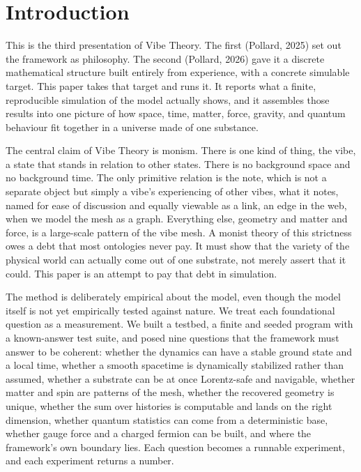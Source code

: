 \section{Introduction}
\label{sec:introduction}

This is the third presentation of Vibe Theory. The first (Pollard, 2025) set out the framework as philosophy. The second (Pollard, 2026) gave it a discrete mathematical structure built entirely from experience, with a concrete simulable target. This paper takes that target and runs it. It reports what a finite, reproducible simulation of the model actually shows, and it assembles those results into one picture of how space, time, matter, force, gravity, and quantum behaviour fit together in a universe made of one substance.

The central claim of Vibe Theory is monism. There is one kind of thing, the vibe, a state that stands in relation to other states. There is no background space and no background time. The only primitive relation is the note, which is not a separate object but simply a vibe's experiencing of other vibes, what it notes, named for ease of discussion and equally viewable as a link, an edge in the web, when we model the mesh as a graph. Everything else, geometry and matter and force, is a large-scale pattern of the vibe mesh. A monist theory of this strictness owes a debt that most ontologies never pay. It must show that the variety of the physical world can actually come out of one substrate, not merely assert that it could. This paper is an attempt to pay that debt in simulation.

The method is deliberately empirical about the model, even though the model itself is not yet empirically tested against nature. We treat each foundational question as a measurement. We built a testbed, a finite and seeded program with a known-answer test suite, and posed nine questions that the framework must answer to be coherent: whether the dynamics can have a stable ground state and a local time, whether a smooth spacetime is dynamically stabilized rather than assumed, whether a substrate can be at once Lorentz-safe and navigable, whether matter and spin are patterns of the mesh, whether the recovered geometry is unique, whether the sum over histories is computable and lands on the right dimension, whether quantum statistics can come from a deterministic base, whether gauge force and a charged fermion can be built, and where the framework's own boundary lies. Each question becomes a runnable experiment, and each experiment returns a number.

